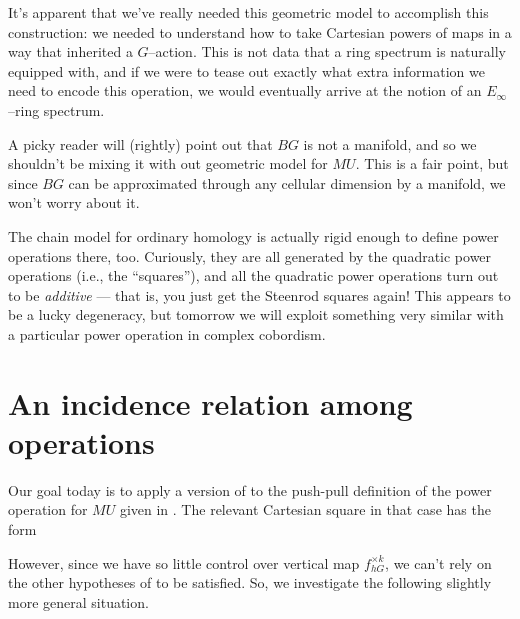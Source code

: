 \begin{remark}
It's apparent that we've really needed this geometric model to accomplish this construction: we needed to understand how to take Cartesian powers of maps in a way that inherited a $G$--action.  This is not data that a ring spectrum is naturally equipped with, and if we were to tease out exactly what extra information we need to encode this operation, we would eventually arrive at the notion of an $E_\infty$--ring spectrum.
\end{remark}

\begin{remark}
A picky reader will (rightly) point out that $BG$ is not a manifold, and so we shouldn't be mixing it with out geometric model for $MU$.  This is a fair point, but since $BG$ can be approximated through any cellular dimension by a manifold, we won't worry about it.
\end{remark}

\begin{remark}
The chain model for ordinary homology is actually rigid enough to define power operations there, too.  Curiously, they are all generated by the quadratic power operations (i.e., the ``squares''), and all the quadratic power operations turn out to be \emph{additive} --- that is, you just get the Steenrod squares again!  This appears to be a lucky degeneracy, but tomorrow we will exploit something very similar with a particular power operation in complex cobordism.
\end{remark}









\section{An incidence relation among operations}


Our goal today is to apply a version of  to the push-pull definition of the power operation for $MU$ given in .  The relevant Cartesian square in that case has the form
\begin{center}
\end{center}
However, since we have so little control over vertical map $f^{\times k}_{hG}$, we can't rely on the other hypotheses of  to be satisfied.  So, we investigate the following slightly more general situation.

